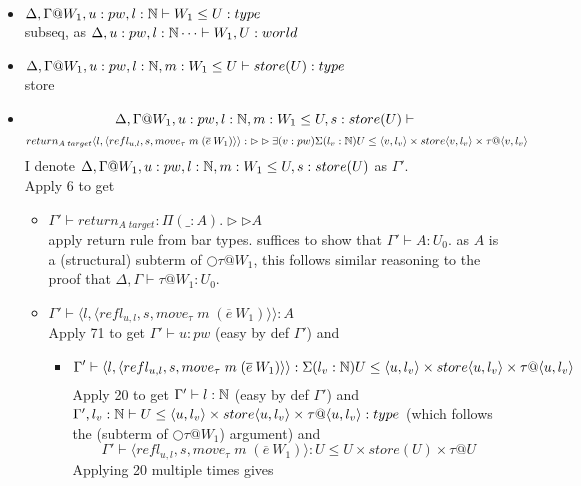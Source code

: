 \message{ !name(paper.tex)}\documentclass{article}
\begin{document}
\begin{itemize}
     \item $\Delta, \Gamma@W_1, u: pw, l: \N \vdash W_1 \leq U: type$\\
     subseq, as $\Delta,  u: pw, l : \mathbb{N} \dots \vdash W_1, U : world$
     \item $\Delta, \Gamma@W_1, u: pw, l : \N, m: W_1 \leq U \vdash  store(U) : type$\\
     store
     \item \[\Delta, \Gamma@W_1, u: pw, l : \N, m: W_1 \leq U, s: store(U) \vdash\]
     \[return_{A\;target}\langle l, \langle refl_{u, l}, s, move_{\tau}\;m\;(\overline{e} \: W_1) \rangle\rangle: \rhd \rhd \exists(v: pw)\Sigma(l_v : \N)U \leq \langle v, l_v\rangle \times store\langle v, l_v\rangle \times \tau@\langle v, l_v\rangle \]
     I denote $\Delta, \Gamma@W_1, u: pw, l : \N, m: W_1 \leq U, s: store(U) $ as $\Gamma'$.\\
     Apply 6 to get
     \begin{itemize}
         \item $\Gamma' \vdash return_{A\;target} : \Pi(\_ :A).\rhd \rhd A$\\
        apply return rule from bar types. suffices to show that
        $\Gamma' \vdash A: U_0$. as $A$ is a (structural) subterm of $\bigcirc \tau @ W_1$, this follows similar reasoning to the proof that $\Delta, \Gamma \vdash \tau @ W_1 : U_0$.
         \item $\Gamma' \vdash \langle l, \langle refl_{u, l}, s, move_{\tau}\;m\;(\overline{e} \: W_1) \rangle\rangle : A$\\
         Apply 71 to get $\Gamma' \vdash u : pw$ (easy by def $\Gamma'$) and 
         \begin{itemize}
             \item \[\Gamma' \vdash  \langle l, \langle refl_{u, l}, s, move_{\tau}\;m\;(\overline{e} \: W_1) \rangle\rangle: \Sigma(l_v : \N)U \leq \langle u, l_v\rangle \times store\langle u, l_v\rangle \times \tau@\langle u, l_v\rangle\]
             Apply 20 to get $\Gamma' \vdash l : \mathbb{N}$ (easy by def $\Gamma'$) and\\  $\Gamma', l_v: \N \vdash U \leq \langle u, l_v\rangle \times store\langle u, l_v\rangle \times \tau@\langle u, l_v\rangle : type$ (which follows the (subterm of $\bigcirc \tau @ W_1$) argument) and 
      \[\Gamma' \vdash \langle refl_{u, l}, s, move_{\tau}\;m\;(\overline{e} \: W_1) \rangle :
                 U \leq U \times store(U) \times \tau@U\]
                 Applying 20 multiple times gives

\end{itemize}
\end{itemize}
\end{itemize}
\end{document}
